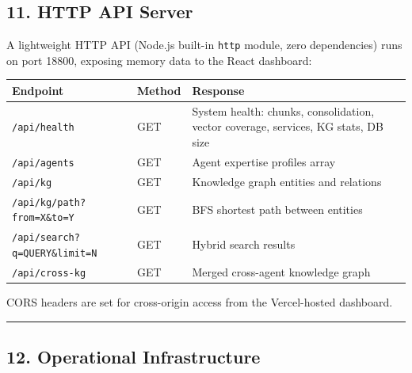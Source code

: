 \documentclass[
]{article}
\newcounter{none} %
\begin{document}
\subsection{11. HTTP API Server}\label{http-api-server}

A lightweight HTTP API (Node.js built-in \texttt{http} module, zero
dependencies) runs on port 18800, exposing memory data to the React
dashboard:

{\def\LTcaptype{none} %
\begin{longtable}[]{@{}
  >{\raggedright\arraybackslash}p{}
  >{\raggedright\arraybackslash}p{}
  >{\raggedright\arraybackslash}p{}@{}}
\toprule\noalign{}
\begin{minipage}[b]{\linewidth}\raggedright
Endpoint
\end{minipage} & \begin{minipage}[b]{\linewidth}\raggedright
Method
\end{minipage} & \begin{minipage}[b]{\linewidth}\raggedright
Response
\end{minipage} \\
\midrule\noalign{}
\endhead
\bottomrule\noalign{}
\endlastfoot
\texttt{/api/health} & GET & System health: chunks, consolidation,
vector coverage, services, KG stats, DB size \\
\texttt{/api/agents} & GET & Agent expertise profiles array \\
\texttt{/api/kg} & GET & Knowledge graph entities and relations \\
\texttt{/api/kg/path?from=X\&to=Y} & GET & BFS shortest path between
entities \\
\texttt{/api/search?q=QUERY\&limit=N} & GET & Hybrid search results \\
\texttt{/api/cross-kg} & GET & Merged cross-agent knowledge graph \\
\end{longtable}
}

CORS headers are set for cross-origin access from the Vercel-hosted
dashboard.

\begin{center}\rule{0.5\linewidth}{0.5pt}\end{center}

\subsection{12. Operational
Infrastructure}\label{operational-infrastructure}
\end{document}
